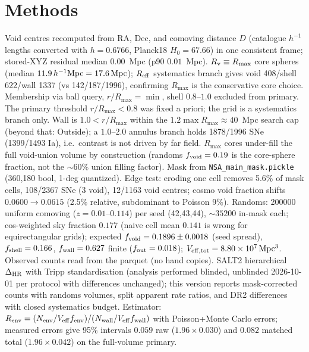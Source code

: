 \section{Methods}
Void centres recomputed from RA, Dec, and comoving distance $D$ (catalogue $h^{-1}$ lengths converted with $h=0.6766$, Planck18 $H_0=67.66$) in one consistent frame; stored-XYZ residual median $0.00$~Mpc (p90 $0.01$~Mpc). $R_{\rm v}\equiv R_{\max}$ core spheres (median $11.9\,h^{-1}{\rm Mpc}=17.6\,{\rm Mpc}$); $R_{\rm eff}$ systematics branch gives void 408/shell 622/wall 1337 (vs 142/187/1996), confirming $R_{\max}$ is the conservative core choice. Membership via ball query, $r/R_{\max}=\min$, shell $0.8$--$1.0$ excluded from primary. The primary threshold $r/R_{\max}<0.8$ was fixed a priori; the grid is a systematics branch only. Wall is $1.0<r/R_{\max}$ within the $1.2\max R_{\max}\approx40$~Mpc search cap (beyond that: Outside); a $1.0$--$2.0$ annulus branch holds 1878/1996 SNe (1399/1493 Ia), i.e.\ contrast is not driven by far field. $R_{\max}$ cores under-fill the full void-union volume by construction (randoms $f_{\rm void}=0.19$ is the core-sphere fraction, not the $\sim60$\% union filling factor). Mask from \texttt{NSA\_main\_mask.pickle} (360,180 bool, 1-deg quantized). Edge test: eroding one cell removes 5.6\% of mask cells, 108/2367 SNe (3 void), 12/1163 void centres; cosmo void fraction shifts $0.0600\rightarrow0.0615$ (2.5\% relative, subdominant to Poisson 9\%). Randoms: 200000 uniform comoving ($z=0.01$--$0.114$) per seed (42,43,44), $\sim35200$ in-mask each; cos-weighted sky fraction $0.177$ (naive cell mean $0.141$ is wrong for equirectangular grids); expected $f_{\rm void}=0.1896\pm0.0018$ (seed spread), $f_{\rm shell}=0.166$, $f_{\rm wall}=0.627$ finite ($f_{\rm out}=0.018$); $V_{\rm eff,tot}=8.80\times10^{7}\,{\rm Mpc^{3}}$. Observed counts read from the parquet (no hand copies). SALT2 \citep{guy07} hierarchical $\Delta_{\rm HR}$ with Tripp standardisation \citep{tripp98} (analysis performed blinded, unblinded 2026-10-01 per protocol with differences unchanged); this version reports mask-corrected counts with randoms volumes, split apparent rate ratios, and DR2 differences with closed systematics budget. Estimator: $R_{\rm env}=(N_{\rm env}/V_{\rm eff}f_{\rm env})/(N_{\rm wall}/V_{\rm eff}f_{\rm wall})$ with Poisson+Monte Carlo errors; measured errors give 95\% intervals $0.059$ raw ($1.96\times0.030$) and $0.082$ matched total ($1.96\times0.042$) on the full-volume primary.
